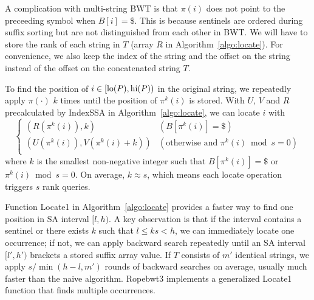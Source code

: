 \documentclass[webpdf,contemporary,large,namedate]{oup-authoring-template}%
\begin{document}
A complication with multi-string BWT is that $\pi(i)$ does not point to the preceeding symbol when $B[i]=\$$.
This is because sentinels are ordered during suffix sorting but are not distinguished from each other in BWT.
We will have to store the rank of each string in $T$ (array $R$ in Algorithm~\ref{algo:locate}).
For convenience, we also keep the index of the string and the offset on the string instead of the offset on the concatenated string $T$.

To find the position of $i\in[{\rm lo}(P),{\rm hi}(P))$ in the original string,
we repeatedly apply $\pi(\cdot)$ $k$ times until the position of $\pi^k(i)$ is stored.
With $U$, $V$ and $R$ precalculated by {\sc IndexSSA} in Algorithm~\ref{algo:locate},
we can locate $i$ with
$$
\left\{\begin{array}{ll}
(R(\pi^k(i)),k) & (B[\pi^k(i)]=\$) \\
(U(\pi^k(i)),V(\pi^k(i)+k)) & (\mbox{otherwise and $\pi^k(i)\bmod s=0$})\\
\end{array}\right.
$$
where $k$ is the smallest non-negative integer such that $B[\pi^k(i)]=\$$ or $\pi^k(i)\bmod s=0$.
On average, $k\approx s$, which means each locate operation triggers $s$ rank queries.

Function {\sc Locate1} in Algorithm~\ref{algo:locate} provides a faster way to find one position in SA interval $[l,h)$.
A key observation is that if the interval contains a sentinel or there exists $k$ such that $l\le ks<h$,
we can immediately locate one occurrence; if not, we can apply backward search repeatedly until an SA interval $[l',h')$
brackets a stored suffix array value.
If $T$ consists of $m'$ identical strings, we apply $s/\min(h-l,m')$ rounds of backward searches on average,
usually much faster than the naive algorithm.
Ropebwt3 implements a generalized {\sc Locate1} function that finds multiple occurrences.
\end{document}
